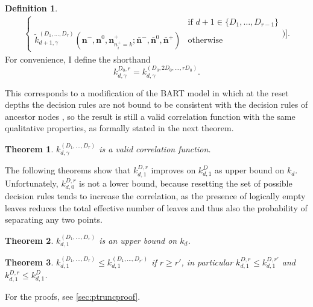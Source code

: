\documentclass[a4paper]{article}
\newcommand{\barnvecs}{\bar{\mathbf n}^-, \bar{\mathbf n}^0, \bar{\mathbf n}^+}
\newtheorem{theorem}{Theorem}
\theoremstyle{definition}
\newtheorem{definition}{Definition}
\begin{document}
\begin{definition}
\begin{align}
\begin{cases}
                            & \text{if $d+1 \in \{D_1, \ldots, D_{r-1}\}$} \\
                        \tilde k^{(D_1,\ldots,D_r)}_{d+1,\gamma}(\mathbf n^-, \mathbf n^0, \mathbf n^+_{n^+_i=k};\barnvecs)
                            & \text{otherwise}
                    \end{cases}
                \Bigg)
            \Bigg]. \label{eq:ptruncorr}
        \end{align}
        For convenience, I define the shorthand
        \begin{equation}
            k^{D_0,r}_{d,\gamma} = k^{(D_0, 2D_0,\ldots,rD_0)}_{d,\gamma}.
        \end{equation}
    \end{definition}

    This corresponds to a modification of the BART model in which at the reset depths the decision rules are not bound to be consistent with the decision rules of ancestor nodes \autocite[which was already used more extensively in][prop.~1]{linero2017}, so the result is still a valid correlation function with the same qualitative properties, as formally stated in the next theorem.

    \begin{theorem}
        $k^{(D_1,\ldots,D_r)}_{d,\gamma}$ is a valid correlation function. \label{th:prtruncorrpos}
    \end{theorem}

    The following theorems show that $k^{D,r}_{d,1}$ improves on $k^D_{d,1}$ as upper bound on $k_d$. Unfortunately, $k^{D,r}_{d,0}$ is not a lower bound, because resetting the set of possible decision rules tends to increase the correlation, as the presence of logically empty leaves reduces the total effective number of leaves and thus also the probability of separating any two points.

    \begin{theorem}
        $k^{(D_1,\ldots,D_r)}_{d,1}$ is an upper bound on $k_d$. \label{th:prtruncorrup}
    \end{theorem}

    \begin{theorem}
        $k^{(D_1,\ldots,D_r)}_{d,1} \le k^{(D_1,\ldots,D_{r'})}_{d,1}$ if $r\ge r'$, in particular $k^{D,r}_{d,1} \le k^{D,r'}_{d,1}$ and $k^{D,r}_{d,1} \le k^{D}_{d,1}$. \label{th:prtruncorrupbetter}
    \end{theorem}

    For the proofs, see \autoref{sec:ptruncproof}.
\end{document}
